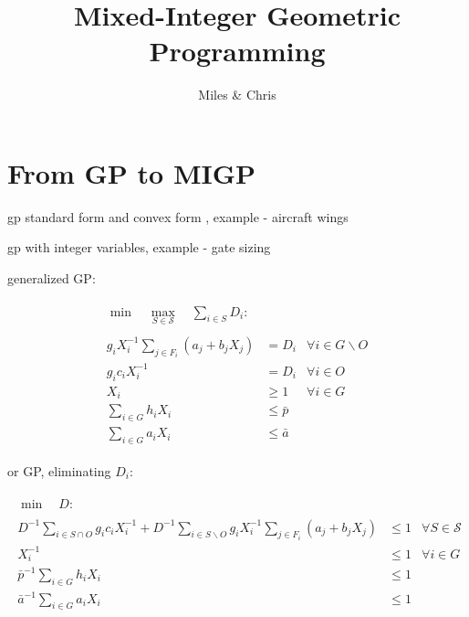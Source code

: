 \documentclass[]{article}
\title{Mixed-Integer Geometric Programming}
\author{Miles \& Chris}
\date{}
\begin{document}
\maketitle


\section{From GP to MIGP}

gp standard form and convex form \cite{boyd07}, example - aircraft wings \cite{hoburg14a}

gp with integer variables, example - gate sizing \cite{boyd07}

generalized GP:

\begin{subequations}
\begin{gather}
\begin{align}
\min \quad \max_{S \in \mathcal{S}} \quad
\sum_{i \in S} D_i :
\end{align}
\\
\begin{align}
g_i X_i^{-1} \sum_{j \in F_i} \left( a_j + b_j X_j \right) 
& = D_i
& \forall i \in G \backslash O
\\
g_i c_i X_i^{-1} 
& = D_i 
& \forall i \in O
\\
X_i
& \geq 1
& \forall i \in G
\\
\sum_{i \in G} h_i X_i 
& \leq \bar{p}
\\
\sum_{i \in G} a_i X_i 
& \leq \bar{a}
\end{align}
\end{gather}
\end{subequations}

or GP, eliminating $D_i$:

\begin{subequations}
\begin{gather}
\begin{align}
\min \quad D :
\end{align}
\\
\begin{align}
D^{-1} \sum_{i \in S \cap O} g_i c_i X_i^{-1} + D^{-1} \sum_{i \in S \backslash O} g_i X_i^{-1} \sum_{j \in F_i} \left( a_j + b_j X_j \right)
& \leq 1
& \forall S \in \mathcal{S}
\\
X_i^{-1}
& \leq 1
& \forall i \in G
\\
\bar{p}^{-1} \sum_{i \in G} h_i X_i 
& \leq 1
\\
\bar{a}^{-1} \sum_{i \in G} a_i X_i 
& \leq 1
\end{align}
\end{gather}
\end{subequations}
\end{document}

